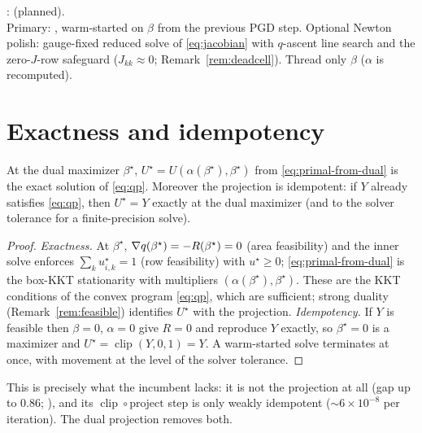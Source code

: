 \documentclass[11pt,a4paper]{article}
\begin{document}
\begin{tcolorbox}[colback=blue!4!white, colframe=blue!40!black,
                  title={Code: outer solve}, fontupper=\small]
:  (planned).\\[2pt]
Primary: , warm-started on
$\beta$ from the previous PGD step. Optional Newton polish: gauge-fixed reduced solve of
\eqref{eq:jacobian} with $q$-ascent line search and the zero-$J$-row safeguard
($J_{kk}\approx0$; Remark~\ref{rem:deadcell}). Thread only $\beta$ ($\alpha$ is recomputed).
\end{tcolorbox}

\section{Exactness and idempotency}
\label{sec:exact}
\begin{prop}
\label{prop:exact}
At the dual maximizer $\beta^\star$, $U^\star=U(\alpha(\beta^\star),\beta^\star)$ from
\eqref{eq:primal-from-dual} is the exact solution of \eqref{eq:qp}. Moreover the projection is
idempotent: if $Y$ already satisfies \eqref{eq:qp}, then $U^\star=Y$ exactly at the dual
maximizer (and to the solver tolerance for a finite-precision solve).
\end{prop}
\begin{proof}
\emph{Exactness.} At $\beta^\star$, $\nabla q(\beta^\star)=-R(\beta^\star)=0$ (area feasibility)
and the inner solve enforces $\sum_k u^\star_{i,k}=1$ (row feasibility) with $u^\star\ge0$;
\eqref{eq:primal-from-dual} is the box-KKT stationarity with multipliers
$(\alpha(\beta^\star),\beta^\star)$. These are the KKT conditions of the convex program
\eqref{eq:qp}, which are sufficient; strong duality (Remark~\ref{rem:feasible}) identifies
$U^\star$ with the projection. \emph{Idempotency.} If $Y$ is feasible then $\beta=0$,
$\alpha=0$ give $R=0$ and reproduce $Y$ exactly, so $\beta^\star=0$ is a maximizer and
$U^\star=\operatorname{clip}(Y,0,1)=Y$. A warm-started solve terminates at once, with movement
at the level of the solver tolerance.
\end{proof}

This is precisely what the incumbent lacks: it is not the projection at all (gap up to $0.86$;
), and its
$\operatorname{clip}\!\circ\!\text{project}$ step is only weakly idempotent
($\sim\!6\times10^{-8}$ per iteration). The dual projection removes both.
\end{document}
